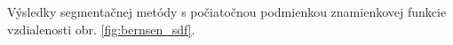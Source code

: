 \documentclass[a4paper,11pt,oneside]{article}%
\begin{document}
Výsledky segmentačnej metódy s počiatočnou podmienkou znamienkovej funkcie vzdialenosti obr. \ref{fig:bernsen_sdf}.


\begin{figure}[H]  
    \hspace{5px}

\end{figure}
\end{document}
